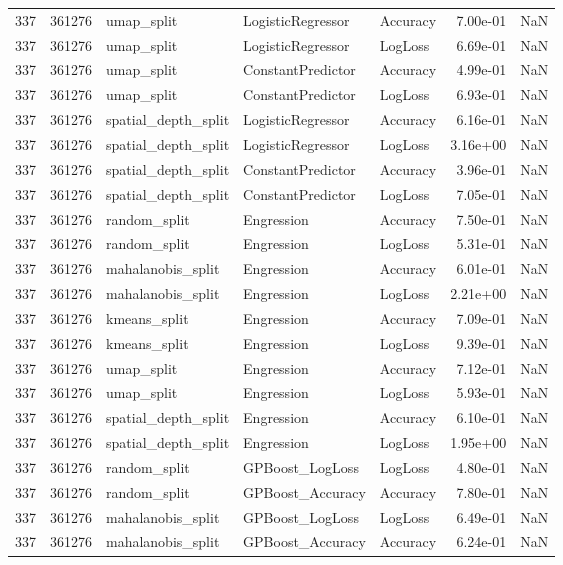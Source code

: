 \begin{tabular}{rrlllrr}
337 & 361276 & umap\_split & LogisticRegressor & Accuracy & 7.00e-01 & NaN \\
337 & 361276 & umap\_split & LogisticRegressor & LogLoss & 6.69e-01 & NaN \\
337 & 361276 & umap\_split & ConstantPredictor & Accuracy & 4.99e-01 & NaN \\
337 & 361276 & umap\_split & ConstantPredictor & LogLoss & 6.93e-01 & NaN \\
337 & 361276 & spatial\_depth\_split & LogisticRegressor & Accuracy & 6.16e-01 & NaN \\
337 & 361276 & spatial\_depth\_split & LogisticRegressor & LogLoss & 3.16e+00 & NaN \\
337 & 361276 & spatial\_depth\_split & ConstantPredictor & Accuracy & 3.96e-01 & NaN \\
337 & 361276 & spatial\_depth\_split & ConstantPredictor & LogLoss & 7.05e-01 & NaN \\
337 & 361276 & random\_split & Engression & Accuracy & 7.50e-01 & NaN \\
337 & 361276 & random\_split & Engression & LogLoss & 5.31e-01 & NaN \\
337 & 361276 & mahalanobis\_split & Engression & Accuracy & 6.01e-01 & NaN \\
337 & 361276 & mahalanobis\_split & Engression & LogLoss & 2.21e+00 & NaN \\
337 & 361276 & kmeans\_split & Engression & Accuracy & 7.09e-01 & NaN \\
337 & 361276 & kmeans\_split & Engression & LogLoss & 9.39e-01 & NaN \\
337 & 361276 & umap\_split & Engression & Accuracy & 7.12e-01 & NaN \\
337 & 361276 & umap\_split & Engression & LogLoss & 5.93e-01 & NaN \\
337 & 361276 & spatial\_depth\_split & Engression & Accuracy & 6.10e-01 & NaN \\
337 & 361276 & spatial\_depth\_split & Engression & LogLoss & 1.95e+00 & NaN \\
337 & 361276 & random\_split & GPBoost\_LogLoss & LogLoss & 4.80e-01 & NaN \\
337 & 361276 & random\_split & GPBoost\_Accuracy & Accuracy & 7.80e-01 & NaN \\
337 & 361276 & mahalanobis\_split & GPBoost\_LogLoss & LogLoss & 6.49e-01 & NaN \\
337 & 361276 & mahalanobis\_split & GPBoost\_Accuracy & Accuracy & 6.24e-01 & NaN \\

\end{tabular}
